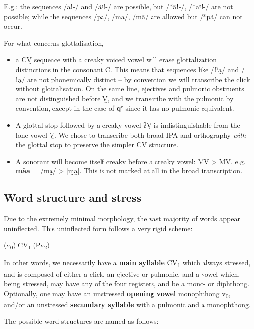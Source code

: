 \documentclass[11pt,a5paper]{book}
\newcommand{\qcn}[1]{\textcolor{AccentText}{\large\textbf{#1}}}
\begin{document}
E.g.: the sequences /aǃ-/ and /ãᵑǃ-/ are possible, but /*ãǃ-/, /*aᵑǃ-/ are not possible; while the sequences /pa/, /ma/, /mã/ are allowed but /*pã/ can not occur.

For what concerns glottalisation, 

\begin{itemize}
\item a CV̰ sequence with a creaky voiced vowel will erase glottalization distinctions in the consonant C. This means that sequences like /ǃˀa̰/ and /ǃa̰/ are not phonemically distinct -- by convention we will transcribe the click without glottalisation. On the same line, ejectives and pulmonic obstruents are not distinguished before V̰, and we transcribe with the pulmonic by convention, except in the case of \qcn{qʼ} since it has no pulmonic equivalent.
\item A glottal stop followed by a creaky vowel ʔV̰ is indistinguishable from the lone vowel V̰. We chose to transcribe both broad IPA and orthography \emph{with} the glottal stop to preserve the simpler CV structure.
\item A sonorant will become itself creaky before a creaky vowel: MV̰ > M̰V̰, e.g. \qcn{màa} = /ma̰/ > [m̰a̰]. This is not marked at all in the broad transcription.
\end{itemize}



\subsection{Word structure and stress}


Due to the extremely minimal morphology, the vast majority of words appear uninflected. This uninflected form follows a very rigid scheme:

\begin{center}
\LARGE (v\textsubscript{0}).\stress{}CV\textsubscript{1}.(Pv\textsubscript{2})
\end{center}

In other words, we necessarily have a \textbf{main syllable} CV\textsubscript{1} which always stressed, and is composed of either a click, an ejective or pulmonic, and a vowel which, being stressed, may have any of the four registers, and be a mono- or diphthong. Optionally, one may have an unstressed \textbf{opening vowel} monophthong v\textsubscript{0}, and/or an unstressed \textbf{secundary syllable} with a pulmonic and a monophthong.

The possible word structures are named as follows:
\end{document}
